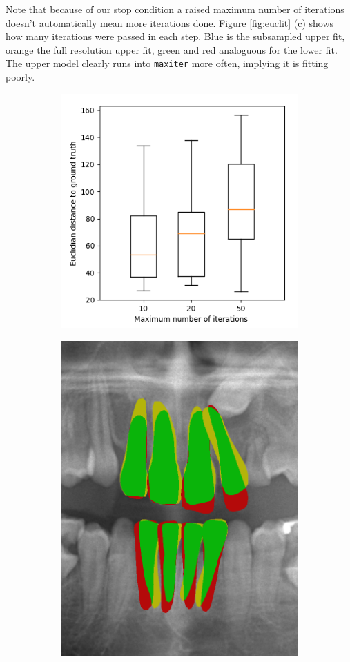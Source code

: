 \documentclass[a4paper,titlepage,12pt]{article}
\begin{document}
Note that because of our stop condition a raised maximum number of iterations doesn't automatically mean more iterations done. Figure \ref{fig:euclit} (c) shows how many iterations were passed in each step. {\color{blue} Blue} is the subsampled upper fit, {\color{orange} orange} the full resolution upper fit, {\color{green} green} and {\color{red} red} analoguous for the lower fit. The upper model clearly runs into \texttt{maxiter} more often, implying it is fitting poorly. 

\begin{figure}
	\centering
	\begin{subfigure}{0.4\linewidth}
		\centering
		\includegraphics[width=\columnwidth]{results/chart_euclit}
		\caption{}
	\end{subfigure}
	\begin{subfigure}{0.57\linewidth}
		\centering
		\includegraphics[width=0.45\columnwidth]{results/7i10}

\end{subfigure}
\end{figure}
\end{document}
